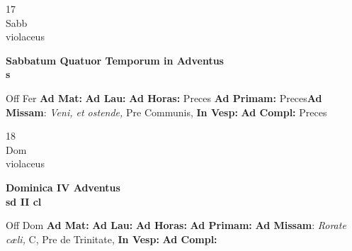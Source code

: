 \documentclass[10pt, openany]{book}
\begin{document}
    \begin{center}
        \begin{minipage}{3.5in}
            \vspace{2em}
            \begin{minipage}{0.5in}
                {\Huge 17} \\
                {\normalsize Sabb} \\
                {\normalsize violaceus}
            \end{minipage}
            \begin{minipage}{3.0in}
                \textbf{ \large Sabbatum Quatuor Temporum in Adventus \\
                \textnormal{\normalsize s}} \\ 
            \end{minipage}
            \begin{justify}Off Fer
                \textbf{Ad Mat: }
                \textbf{Ad Lau: }
                \textbf{Ad Horas: }Preces
                \textbf{Ad Primam: }Preces\textbf{Ad Missam}: \textit{Veni, et ostende,} Pre Communis,  
                \textbf{In Vesp: }
                \textbf{Ad Compl: }Preces
            \end{justify}
        \end{minipage}
    \end{center}

    \begin{center}
        \begin{minipage}{3.5in}
            \vspace{2em}
            \begin{minipage}{0.5in}
                {\Huge 18} \\
                {\normalsize Dom} \\
                {\normalsize violaceus}
            \end{minipage}
            \begin{minipage}{3.0in}
                \textbf{ \large Dominica IV Adventus \\
                \textnormal{\normalsize sd II cl}} \\ 
            \end{minipage}
            \begin{justify}Off Dom
                \textbf{Ad Mat: }
                \textbf{Ad Lau: }
                \textbf{Ad Horas: }
                \textbf{Ad Primam: }\textbf{Ad Missam}: \textit{Rorate cæli,} C, Pre de Trinitate,  
                \textbf{In Vesp: }
                \textbf{Ad Compl: }
            \end{justify}
        \end{minipage}
    \end{center}
\end{document}
